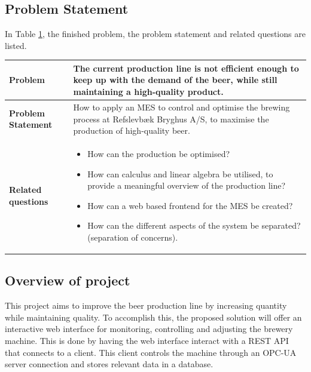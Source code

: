 \subsection{Problem Statement}
In Table \ref{table:problem-statement-report}, the finished problem, the problem statement and related questions are listed.
\begin{table}[ht]
    \begin{tabularx}{\textwidth}{|>{\RaggedRight}p{4cm}|>{\RaggedRight}X|}
        \hline
        \textbf{Problem} & The current production line is not efficient enough to keep up with the demand of the beer, while still maintaining a high-quality product. \\
        \hline
        \textbf{Problem Statement} & How to apply an MES to control and optimise the brewing process at Refslevbæk Bryghus A/S, to maximise the production of high-quality beer. \\
        \hline
        \textbf{Related questions} & 
            \begin{itemize}
                \item How can the production be optimised?
                \item How can calculus and linear algebra be utilised, to provide a meaningful overview of the production line?
                \item How can a web based frontend for the MES be created?
                \item How can the different aspects of the system be separated? (separation of concerns).
            \end{itemize} \\
            \hline
    \end{tabularx}
    \label{table:problem-statement-report}
\end{table} 

\subsection{Overview of project}
This project aims to improve the beer production line by increasing quantity
while maintaining quality. To accomplish this, the proposed solution will offer
an interactive web interface for monitoring, controlling and adjusting the
brewery machine. This is done by having the web interface interact with a REST
API that connects to a client. This client controls the machine through an
OPC-UA server connection and stores relevant data in a database.


